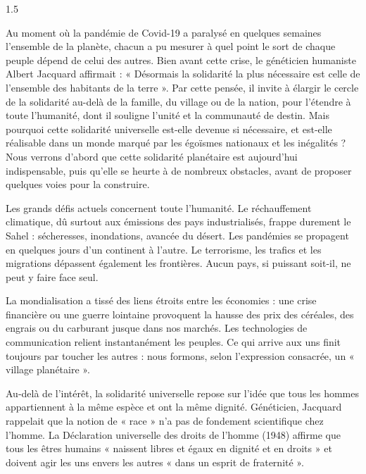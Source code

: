 \documentclass[12pt]{article}
\begin{document}
\begin{spacing}{1.5}


Au moment où la pandémie de Covid-19 a paralysé en quelques semaines l'ensemble de la planète, chacun a pu mesurer à quel point le sort de chaque peuple dépend de celui des autres. Bien avant cette crise, le généticien humaniste Albert Jacquard affirmait : « Désormais la solidarité la plus nécessaire est celle de l'ensemble des habitants de la terre ». Par cette pensée, il invite à élargir le cercle de la solidarité au-delà de la famille, du village ou de la nation, pour l'étendre à toute l'humanité, dont il souligne l'unité et la communauté de destin. Mais pourquoi cette solidarité universelle est-elle devenue si nécessaire, et est-elle réalisable dans un monde marqué par les égoïsmes nationaux et les inégalités ? Nous verrons d'abord que cette solidarité planétaire est aujourd'hui indispensable, puis qu'elle se heurte à de nombreux obstacles, avant de proposer quelques voies pour la construire.


Les grands défis actuels concernent toute l'humanité. Le réchauffement climatique, dû surtout aux émissions des pays industrialisés, frappe durement le Sahel : sécheresses, inondations, avancée du désert. Les pandémies se propagent en quelques jours d'un continent à l'autre. Le terrorisme, les trafics et les migrations dépassent également les frontières. Aucun pays, si puissant soit-il, ne peut y faire face seul.

La mondialisation a tissé des liens étroits entre les économies : une crise financière ou une guerre lointaine provoquent la hausse des prix des céréales, des engrais ou du carburant jusque dans nos marchés. Les technologies de communication relient instantanément les peuples. Ce qui arrive aux uns finit toujours par toucher les autres : nous formons, selon l'expression consacrée, un « village planétaire ».

Au-delà de l'intérêt, la solidarité universelle repose sur l'idée que tous les hommes appartiennent à la même espèce et ont la même dignité. Généticien, Jacquard rappelait que la notion de « race » n'a pas de fondement scientifique chez l'homme. La Déclaration universelle des droits de l'homme (1948) affirme que tous les êtres humains « naissent libres et égaux en dignité et en droits » et doivent agir les uns envers les autres « dans un esprit de fraternité ».


\end{spacing}
\end{document}

